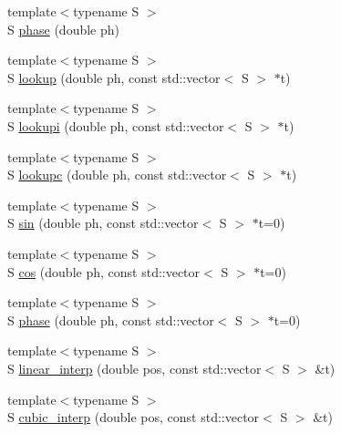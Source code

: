 \begin{DoxyCompactItemize}
\item 
{\footnotesize template$<$typename S $>$ }\\S \hyperlink{namespace_aurora_a2fab91108d29c7101741bcd2ebe1ba72}{phase} (double ph)
\item 
{\footnotesize template$<$typename S $>$ }\\S \hyperlink{namespace_aurora_ae0082f7bc3946a88145d54bacd0c6ff3}{lookup} (double ph, const std\+::vector$<$ S $>$ $\ast$t)
\item 
{\footnotesize template$<$typename S $>$ }\\S \hyperlink{namespace_aurora_a9246ac499667da52a0d1750e5238c4a8}{lookupi} (double ph, const std\+::vector$<$ S $>$ $\ast$t)
\item 
{\footnotesize template$<$typename S $>$ }\\S \hyperlink{namespace_aurora_afab81d7b8873e7850073124fcf37eeea}{lookupc} (double ph, const std\+::vector$<$ S $>$ $\ast$t)
\item 
{\footnotesize template$<$typename S $>$ }\\S \hyperlink{namespace_aurora_a76909b8c5d5801213d35fffa69499885}{sin} (double ph, const std\+::vector$<$ S $>$ $\ast$t=0)
\item 
{\footnotesize template$<$typename S $>$ }\\S \hyperlink{namespace_aurora_a0269c3758ab62d6a910cd8f7ace7fba2}{cos} (double ph, const std\+::vector$<$ S $>$ $\ast$t=0)
\item 
{\footnotesize template$<$typename S $>$ }\\S \hyperlink{namespace_aurora_a6a6af5d9695d0ec8fcb343c456c1faab}{phase} (double ph, const std\+::vector$<$ S $>$ $\ast$t=0)
\item 
{\footnotesize template$<$typename S $>$ }\\S \hyperlink{namespace_aurora_acdc5f35b9cbf54f7fc84a423d76bd488}{linear\+\_\+interp} (double pos, const std\+::vector$<$ S $>$ \&t)
\item 
{\footnotesize template$<$typename S $>$ }\\S \hyperlink{namespace_aurora_a35b9cf383290bddedd82b7c3d0f05e81}{cubic\+\_\+interp} (double pos, const std\+::vector$<$ S $>$ \&t)
\end{DoxyCompactItemize}
